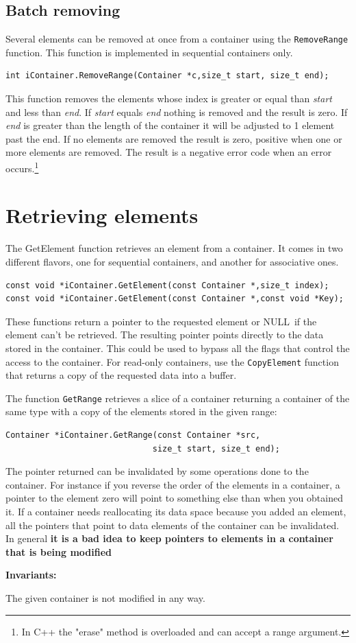 \documentclass[12pt,a4paper]{memoir} %
\newif\iftth
\newcommand{\Const}{
{\par\noindent \textbf{Invariants:}\noindent}
}
\newcommand{\Null}{{\iftth \ NULL \else \footnotesize NULL\  \fi}}
\begin{document}
\subsection{Batch removing}
Several elements can be removed at once from a container using the \texttt{RemoveRange} function. This function is implemented in sequential
containers only.
\begin{verbatim}
int iContainer.RemoveRange(Container *c,size_t start, size_t end);
\end{verbatim}
This function removes the elements whose index is greater or equal than \textsl{start} and less than \textsl{end}. If \textsl{start} equals \textsl{end}
nothing is removed and the result is zero. If \textsl{end} is greater than the length of the container it will be adjusted to 1 element past the
end. If no elements are removed the result is zero, positive when one or more elements are removed. The result is a negative error code when an
error occurs.\footnote{In C++ the "erase" method is overloaded and can accept a range argument.}

\section{Retrieving elements}
The GetElement function retrieves an element from a container. It comes in two different flavors, one for sequential containers, and another for associative ones.
\begin{verbatim}
const void *iContainer.GetElement(const Container *,size_t index);
const void *iContainer.GetElement(const Container *,const void *Key);
\end{verbatim}
These functions return a pointer to the requested element or \Null if the element can't be retrieved. The resulting pointer points directly to the data 
stored in the container. This could be used to bypass all the flags that control the access to the container. For read-only containers, use the 
\texttt{CopyElement} function that returns a copy of the requested data into a buffer.

The function \texttt{GetRange} retrieves a slice of a container returning a container of the same type with a copy of the elements stored in the
given range: 
\begin{verbatim}
Container *iContainer.GetRange(const Container *src,
                              size_t start, size_t end);
\end{verbatim}

The pointer returned can be invalidated by some operations done to the container. For instance if you reverse the order of the elements in a container, 
a pointer to the element zero will point to something else than when you obtained it. If a container needs reallocating its data space because you
added an element, all the pointers that point to data elements of the container can be invalidated. In general \textbf{it is a bad idea to keep pointers 
to elements in a container that is being modified}
\Const The given container is not modified in any way.
\end{document}
